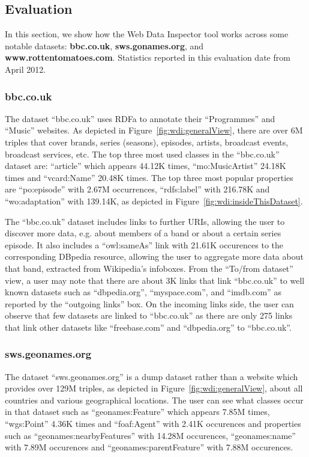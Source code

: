 \subsection{Evaluation}

In this section, we show how the Web Data Inspector tool works across some notable datasets: \textbf{bbc.co.uk}, \textbf{sws.gonames.org}, and \textbf{www.rottentomatoes.com}.
Statistics reported in this evaluation date from April 2012.

\subsubsection{bbc.co.uk}

The dataset ``bbc.co.uk'' uses RDFa to annotate their ``Programmes'' and ``Music'' websites. As depicted in Figure~\ref{fig:wdi:generalView}, there are over 6M triples that cover brands, series (seasons), episodes, artists, broadcast events, broadcast services, etc. The top three most used classes in the ``bbc.co.uk'' dataset are: ``article'' which appears 44.12K times, ``mo:MusicArtist'' 24.18K times and ``vcard:Name'' 20.48K times. The top three most popular properties are ``po:episode'' with 2.67M occurrences, ``rdfs:label'' with 216.78K and ``wo:adaptation'' with 139.14K, as depicted in Figure~\ref{fig:wdi:insideThisDataset}.

The ``bbc.co.uk'' dataset includes links to further URIs, allowing the user to discover more data, e.g. about members of a band or about a certain series episode. It also includes a ``owl:sameAs'' link with 21.61K occurences to the corresponding DBpedia resource, allowing the user to aggregate more data about that band, extracted from Wikipedia's infoboxes. From the ``To/from dataset'' view, a user may note that there are about 3K links that link ``bbc.co.uk'' to well known datasets such as ``dbpedia.org'', ``myspace.com'', and ``imdb.com'' as reported by the ``outgoing links'' box. On the incoming links side, the user can observe that few datasets are linked to ``bbc.co.uk'' as there are only 275 links that link other datasets like ``freebase.com'' and ``dbpedia.org'' to ``bbc.co.uk''.

\subsubsection{sws.geonames.org}

The dataset ``sws.geonames.org'' is a dump dataset rather than a website which provides over 129M triples, as depicted in Figure~\ref{fig:wdi:generalView}, about all countries and various geographical locations. The user can see what classes occur in that dataset such as ``geonames:Feature'' which appears 7.85M times, ``wgs:Point'' 4.36K times and ``foaf:Agent'' with 2.41K occurences and properties such as ``geonames:nearbyFeatures'' with 14.28M occurences, ``geonames:name'' with 7.89M occurences and ``geonames:parentFeature'' with 7.88M occurences.

